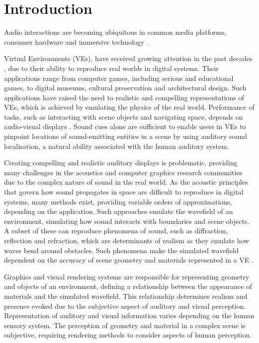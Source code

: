 \chapter{Introduction}\label{ch:introduction}

Audio interactions are becoming ubiquitous in common media platforms, consumer hardware and immersive technology \cite{yang2019audio}.

Virtual Environments (VEs), have received growing attention in the past decades \citep{rubio2017immersive}, due to their ability to reproduce real worlds in digital systems. Their applications range from computer games, including serious and educational games, to digital museums, cultural preservation and architectural design. Such applications have raised the need to realistic and compelling representations of VEs, which is achieved by emulating the physics of the real world. Performance of tasks, such as interacting with scene objects and navigating space, depends on audio-visual displays \citep{zimmons2003influence, lokki2005navigation}. Sound cues alone are sufficient to enable users in VEs to pinpoint locations of sound-emitting entities in a scene by using auditory sound localisation, a natural ability associated with the human auditory system. \par
Creating compelling and realistic auditory displays is problematic, providing many challenges in the acoustics and computer graphics research communities due to the complex nature of sound in the real world. As the acoustic principles that govern how sound propagates in space are difficult to reproduce in digital systems, many methods exist, providing variable orders of approximations, depending on the application. Such approaches emulate the wavefield of an environment, simulating how sound interacts with boundaries and scene objects. A subset of these can reproduce phenomena of sound, such as diffraction, reflection and refraction, which are determinants of realism as they emulate how waves bend around obstacles. Such phenomena make the simulated wavefield dependent on the accuracy of scene geometry and materials represented in a VE \citep{kuttruff2016room}. \par
Graphics and visual rendering systems are responsible for representing geometry and objects of an environment, defining a relationship between the appearance of materials and the simulated wavefield. This relationship determines realism and presence evoked due to the subjective aspect of auditory and visual perception.
Representation of auditory and visual information varies depending on the human sensory system. The perception of geometry and material in a complex scene is subjective, requiring rendering methods to consider aspects of human perception. 

